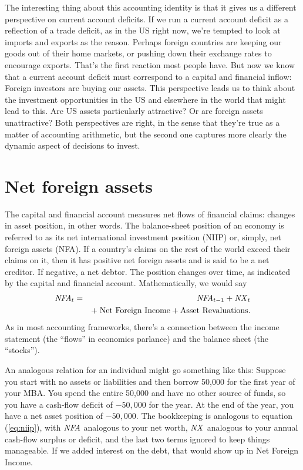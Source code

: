 The interesting thing about this accounting
 identity is that it gives us a different perspective on current account deficits.  If we
run a current account deficit as a reflection of a trade deficit, as
in the US right now, we're tempted to look at imports and exports as
the reason. Perhaps foreign countries are keeping our goods out of
their home markets, or pushing down their exchange rates to encourage
exports.  That's the first reaction most people have.  But now we
know that a current account deficit must correspond to a capital and
financial inflow: Foreign investors are buying our assets.  This
perspective leads us to think about the investment opportunities in
the US and elsewhere in the world that might lead to this. Are US
assets particularly attractive? Or are foreign assets unattractive?
Both perspectives are right, in the sense that they're true as a
matter of accounting  arithmetic, but the second one captures more
clearly the dynamic aspect of decisions to invest.


\section{Net foreign assets}

The capital and financial account measures net flows of financial
claims: changes in asset position, in other words. The balance-sheet
position of an economy is referred to as its net international
investment position (NIIP) or, simply, net foreign assets (NFA).
If a country's claims on the rest of the world exceed
their claims on it,
then it has positive net foreign assets and is said to be a net
creditor. If negative, a net debtor. The position changes over time,
as indicated by the capital and financial account.
Mathematically, we would say
%
\begin{eqnarray}
        \mbox{\it NFA\/}_{t}  &=&
        \mbox{\em NFA\/}_{t-1}  +   \mbox{\em NX\/}_t %
              \nonumber \\
        &&   + \; \mbox{Net Foreign Income} + \mbox{Asset Revaluations} .
        \label{eq:niip}
\end{eqnarray}
As in most accounting
 frameworks, there's a connection
between the income statement (the ``flows'' in economics parlance)
and the balance sheet (the ``stocks'').

An analogous relation for an individual might go something like this:
Suppose you
start with no assets or liabilities and then borrow 50,000 for the
first year of your MBA.
You spend the entire 50,000 and have no other source of funds,
so you have a cash-flow deficit of $-50,000$ for the year.
At the end of the year, you have a net asset position of
$-50,000$.
The bookkeeping is analogous to equation (\ref{eq:niip}),
with $\mbox{\em NFA\/}$ analogous to your net worth,
$\mbox{\em NX\/}$ analogous to your annual cash-flow surplus or deficit,
and the last two terms ignored to keep things manageable.
If we added interest on the debt, that would show up in
Net Foreign Income.


